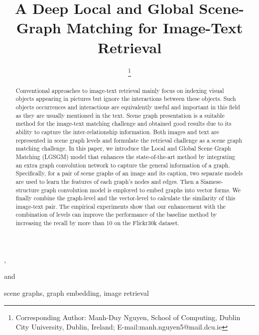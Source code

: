 \documentclass{IOS-Book-Article}
\def\hb{\hbox to 10.7 cm{}}
\begin{document}
\pagestyle{headings}
\def\thepage{}

\begin{frontmatter}              


\title{A Deep Local and Global Scene-Graph Matching for Image-Text Retrieval}

\markboth{}{April 2021\hb}


\author[A]{ \thanks{Corresponding Author: Manh-Duy Nguyen, School of Computing, Dublin City University, Dublin, Ireland; E-mail:manh.nguyen5@mail.dcu.ie}},
\author[B,C,D]{ }
and
\author[A]{ }

\address[A]{School of Computing, Dublin, Ireland}
\address[B]{AISIA Research Lab}
\address[C]{University of Science, Ho Chi Minh City, Vietnam}
\address[D]{Vietnam National University Ho Chi Minh City, Vietnam}





\begin{abstract}
Conventional approaches to image-text retrieval mainly focus on indexing visual objects appearing in pictures but ignore the interactions between these objects. Such objects occurrences and interactions are equivalently useful and important in this field as they are usually mentioned in the text. Scene graph presentation is a suitable method for the image-text matching challenge and obtained good results due to its ability to capture the inter-relationship information. Both images and text are represented in scene graph levels and formulate the retrieval challenge as a scene graph matching challenge. In this paper, we introduce the Local and Global Scene Graph Matching (LGSGM) model that enhances the state-of-the-art method by integrating an extra graph convolution network to capture the general information of a graph. Specifically, for a pair of scene graphs of an image and its caption, two separate models are used to learn the features of each graph's nodes and edges. Then a Siamese-structure graph convolution model is employed to embed graphs into vector forms. We finally combine the graph-level and the vector-level to calculate the similarity of this image-text pair. The empirical experiments show that our enhancement with the combination of levels can improve the performance of the baseline method by increasing the recall by more than 10 on the Flickr30k dataset.
\end{abstract}

\begin{keyword}
scene graphs, graph embedding, image retrieval
\end{keyword}
\end{frontmatter}
\end{document}
